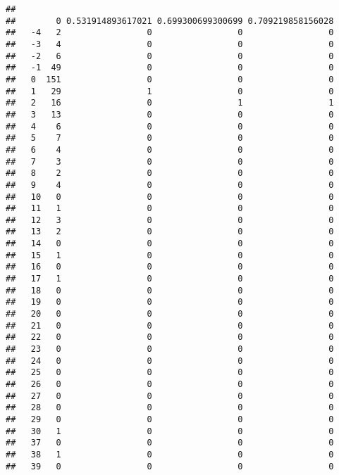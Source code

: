\documentclass[]{article}
\begin{document}
\begin{verbatim}
##     
##        0 0.531914893617021 0.699300699300699 0.709219858156028
##   -4   2                 0                 0                 0
##   -3   4                 0                 0                 0
##   -2   6                 0                 0                 0
##   -1  49                 0                 0                 0
##   0  151                 0                 0                 0
##   1   29                 1                 0                 0
##   2   16                 0                 1                 1
##   3   13                 0                 0                 0
##   4    6                 0                 0                 0
##   5    7                 0                 0                 0
##   6    4                 0                 0                 0
##   7    3                 0                 0                 0
##   8    2                 0                 0                 0
##   9    4                 0                 0                 0
##   10   0                 0                 0                 0
##   11   1                 0                 0                 0
##   12   3                 0                 0                 0
##   13   2                 0                 0                 0
##   14   0                 0                 0                 0
##   15   1                 0                 0                 0
##   16   0                 0                 0                 0
##   17   1                 0                 0                 0
##   18   0                 0                 0                 0
##   19   0                 0                 0                 0
##   20   0                 0                 0                 0
##   21   0                 0                 0                 0
##   22   0                 0                 0                 0
##   23   0                 0                 0                 0
##   24   0                 0                 0                 0
##   25   0                 0                 0                 0
##   26   0                 0                 0                 0
##   27   0                 0                 0                 0
##   28   0                 0                 0                 0
##   29   0                 0                 0                 0
##   30   1                 0                 0                 0
##   37   0                 0                 0                 0
##   38   1                 0                 0                 0
##   39   0                 0                 0                 0

\end{verbatim}
\end{document}
